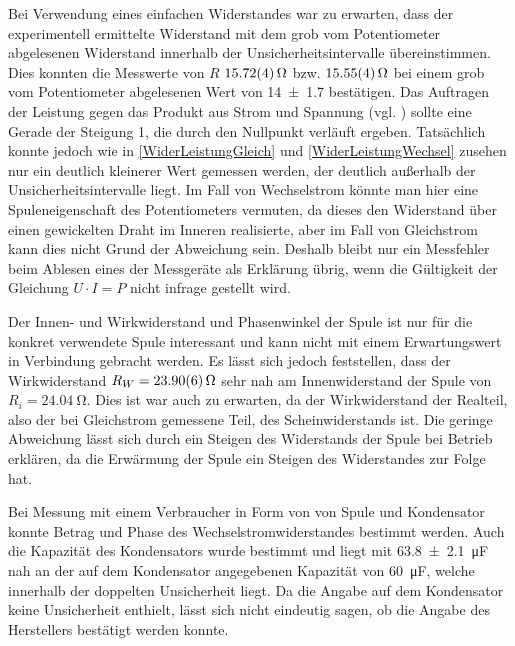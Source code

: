 \documentclass[
	a4paper,
	12pt,
	pagesize,
	ngerman
]{scrartcl}
\begin{document}
	Bei Verwendung eines einfachen Widerstandes war zu erwarten, dass der experimentell ermittelte Widerstand mit dem grob vom Potentiometer abgelesenen Widerstand innerhalb der Unsicherheitsintervalle übereinstimmen.
	Dies konnten die Messwerte von $R$ $\SI{15,72 \pm 0,04}{\Omega}$ bzw. $\SI{15,55 \pm 0,04}{\Omega}$ bei einem grob vom Potentiometer abgelesenen Wert von \SI{14 \pm 1,7}{\Omega} bestätigen.
	Das Auftragen der Leistung gegen das Produkt aus Strom und Spannung (vgl. ) sollte eine Gerade der Steigung 1, die durch den Nullpunkt verläuft ergeben.
	Tatsächlich konnte jedoch wie in \cref{WiderLeistungGleich} und \cref{WiderLeistungWechsel} zusehen nur ein deutlich kleinerer Wert gemessen werden, der deutlich außerhalb der Unsicherheitsintervalle liegt.
	Im Fall von Wechselstrom könnte man hier eine Spuleneigenschaft des Potentiometers vermuten, da dieses den Widerstand über einen gewickelten Draht im Inneren realisierte, aber im Fall von Gleichstrom kann dies nicht Grund der Abweichung sein.
	Deshalb bleibt nur ein Messfehler beim Ablesen eines der Messgeräte als Erklärung übrig, wenn die Gültigkeit der Gleichung $ U \cdot I = P $ nicht infrage gestellt wird.
	\par
	Der Innen- und Wirkwiderstand und Phasenwinkel der Spule ist nur für die konkret verwendete Spule interessant und kann nicht mit einem Erwartungswert in Verbindung gebracht werden.
	Es lässt sich jedoch feststellen, dass der Wirkwiderstand $ R_W = \SI{23,9 \pm 0,06}{\ohm}$ sehr nah am Innenwiderstand der Spule von $ R_i = \SI{24,04}{\ohm} $.
	Dies ist war auch zu erwarten, da der Wirkwiderstand der Realteil, also der bei Gleichstrom gemessene Teil, des Scheinwiderstands ist.
	Die geringe Abweichung lässt sich durch ein Steigen des Widerstands der Spule bei Betrieb erklären, da die Erwärmung der Spule ein Steigen des Widerstandes zur Folge hat.
	\par 
	Bei Messung mit einem Verbraucher in Form von von Spule und Kondensator konnte Betrag und Phase des Wechselstromwiderstandes bestimmt werden.
	Auch die Kapazität des Kondensators wurde bestimmt und liegt mit \SI{63,8 \pm 2,1}{\micro \farad} nah an der auf dem Kondensator angegebenen Kapazität von \SI{60}{\micro \farad}, welche innerhalb der doppelten Unsicherheit liegt.
	Da die Angabe auf dem Kondensator keine Unsicherheit enthielt, lässt sich nicht eindeutig sagen, ob die Angabe des Herstellers bestätigt werden konnte.
	
\end{document}
